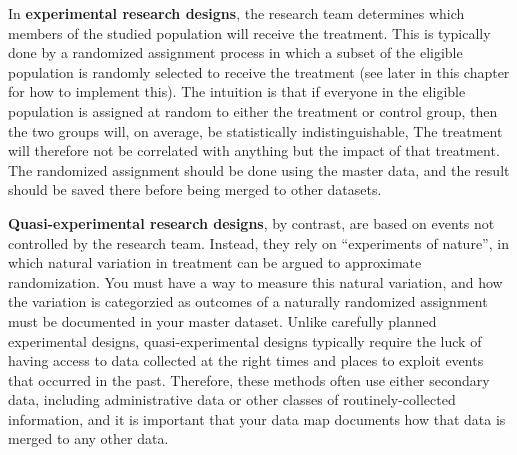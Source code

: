 In \textbf{experimental research designs},
 
the research team determines which members
of the studied population will receive the treatment.
This is typically done by a randomized assignment process
in which a subset of the eligible population
is randomly selected to receive the treatment
(see later in this chapter for how to implement this).
The intuition is that if everyone in the eligible population
is assigned at random to either the treatment or control group,
then the two groups will, on average, be statistically indistinguishable,
The treatment will therefore not be correlated with anything
but the impact of that treatment.\cite{duflo2007using}
The randomized assignment should be done using the master data,
and the result should be saved there before being merged to other datasets.


\textbf{Quasi-experimental research designs},
by contrast, are based on events not controlled by the research team.
Instead, they rely on ``experiments of nature'',
in which natural variation in treatment can be argued to approximate randomization.
You must have a way to measure this natural variation,
and how the variation is categorzied as outcomes of a naturally randomized assignment
must be documented in your master dataset.
Unlike carefully planned experimental designs,
quasi-experimental designs typically require the luck
of having access to data collected at the right times and places
to exploit events that occurred in the past.
Therefore, these methods often use either secondary data,
including administrative data or other classes of routinely-collected information,
and it is important that your data map documents 
how that data is merged to any other data.



